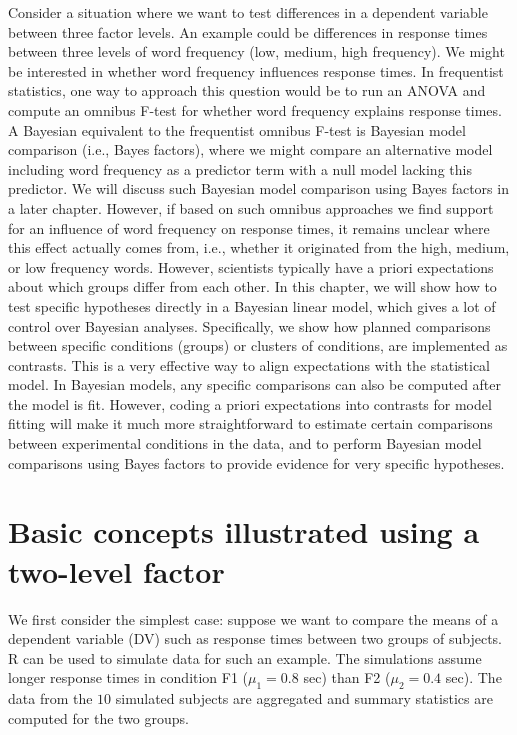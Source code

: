 \documentclass[12pt,]{krantz}
\theoremstyle{definition}
\theoremstyle{definition}
\theoremstyle{definition}
\theoremstyle{remark}
\begin{document}
Consider a situation where we want to test differences in a dependent variable between three factor levels. An example could be differences in response times between three levels of word frequency (low, medium, high frequency). We might be interested in whether word frequency influences response times. In frequentist statistics, one way to approach this question would be to run an ANOVA and compute an omnibus F-test for whether word frequency explains response times. A Bayesian equivalent to the frequentist omnibus F-test is Bayesian model comparison (i.e., Bayes factors), where we might compare an alternative model including word frequency as a predictor term with a null model lacking this predictor. We will discuss such Bayesian model comparison using Bayes factors in a later chapter. However, if based on such omnibus approaches we find support for an influence of word frequency on response times, it remains unclear where this effect actually comes from, i.e., whether it originated from the high, medium, or low frequency words. However, scientists typically have a priori expectations about which groups differ from each other. In this chapter, we will show how to test specific hypotheses directly in a Bayesian linear model, which gives a lot of control over Bayesian analyses. Specifically, we show how planned comparisons between specific conditions (groups) or clusters of conditions, are implemented as contrasts. This is a very effective way to align expectations with the statistical model. In Bayesian models, any specific comparisons can also be computed after the model is fit. However, coding a priori expectations into contrasts for model fitting will make it much more straightforward to estimate certain comparisons between experimental conditions in the data, and to perform Bayesian model comparisons using Bayes factors to provide evidence for very specific hypotheses.

\hypertarget{basic-concepts-illustrated-using-a-two-level-factor}{%
\section{Basic concepts illustrated using a two-level factor}\label{basic-concepts-illustrated-using-a-two-level-factor}}

We first consider the simplest case: suppose we want to compare the means of a dependent variable (DV) such as response times between two groups of subjects. R can be used to simulate data for such an example. The simulations assume longer response times in condition F1 (\(\mu_1 = 0.8\) sec) than F2 (\(\mu_2 = 0.4\) sec). The data from the \(10\) simulated subjects are aggregated and summary statistics are computed for the two groups.
\end{document}
